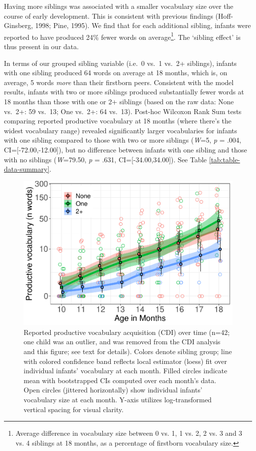 \documentclass[
  man,floatsintext]{apa6}
\begin{document}
Having more siblings was associated with a smaller vocabulary size over the course of early development. This is consistent with previous findings (Hoff-Ginsberg, 1998; Pine, 1995). We find that for each additional sibling, infants were reported to have produced 24\% fewer words on average\footnote{Average difference in vocabulary size between 0 vs. 1, 1 vs. 2, 2 vs. 3 and 3 vs. 4 siblings at 18 months, as a percentage of firstborn vocabulary size.}. The `sibling effect' is thus present in our data.

In terms of our grouped sibling variable (i.e.~0 vs.~1 vs.~2+ siblings), infants with one sibling produced 64 words on average at 18 months, which is, on average, 5 words \emph{more} than their firstborn peers. Consistent with the model results, infants with two or more siblings produced substantially fewer words at 18 months than those with one or 2+ siblings (based on the raw data: None vs.~2+: 59 vs.~13; One vs.~2+: 64 vs.~13). Post-hoc Wilcoxon Rank Sum tests comparing reported productive vocabulary at 18 months (where there's the widest vocabulary range) revealed significantly larger vocabularies for infants with one sibling compared to those with two or more siblings (\emph{W}=5, \emph{p} = .004, CI={[}-72.00,-12.00{]}), but no difference between infants with one sibling and those with no siblings (\emph{W}=79.50, \emph{p} = .631, CI={[}-34.00,34.00{]}). See Table \ref{tab:table-data-summary}.

\begin{figure}
\centering
\includegraphics{SiblingsStudyText-final_files/figure-latex/Figure-SibGroup-1.pdf}
\caption{\label{fig:Figure-SibGroup}Reported productive vocabulary acquisition (CDI) over time (n=42; one child was an outlier, and was removed from the CDI analysis and this figure; see text for details). Colors denote sibling group; line with colored confidence band reflects local estimator (loess) fit over individual infants' vocabulary at each month. Filled circles indicate mean with bootstrapped CIs computed over each month's data. Open circles (jittered horizontally) show individual infants' vocabulary size at each month. Y-axis utilizes log-transformed vertical spacing for visual clarity.}
\end{figure}
\end{document}
